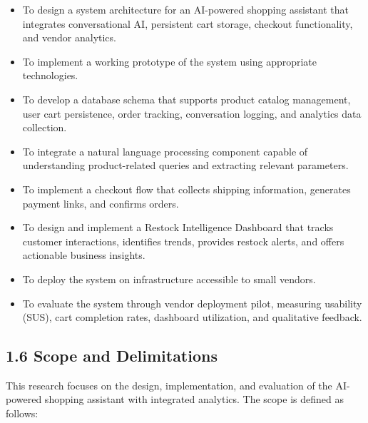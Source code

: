 \documentclass[12pt,a4paper]{article}
\begin{document}
\begin{itemize}
    \item To design a system architecture for an AI-powered shopping assistant that integrates conversational AI, persistent cart storage, checkout functionality, and vendor analytics.
    \item To implement a working prototype of the system using appropriate technologies.
    \item To develop a database schema that supports product catalog management, user cart persistence, order tracking, conversation logging, and analytics data collection.
    \item To integrate a natural language processing component capable of understanding product-related queries and extracting relevant parameters.
    \item To implement a checkout flow that collects shipping information, generates payment links, and confirms orders.
    \item To design and implement a Restock Intelligence Dashboard that tracks customer interactions, identifies trends, provides restock alerts, and offers actionable business insights.
    \item To deploy the system on infrastructure accessible to small vendors.
    \item To evaluate the system through vendor deployment pilot, measuring usability (SUS), cart completion rates, dashboard utilization, and qualitative feedback.
\end{itemize}

\subsection{1.6 Scope and Delimitations}

This research focuses on the design, implementation, and evaluation of the AI-powered shopping assistant with integrated analytics. The scope is defined as follows:
\end{document}
